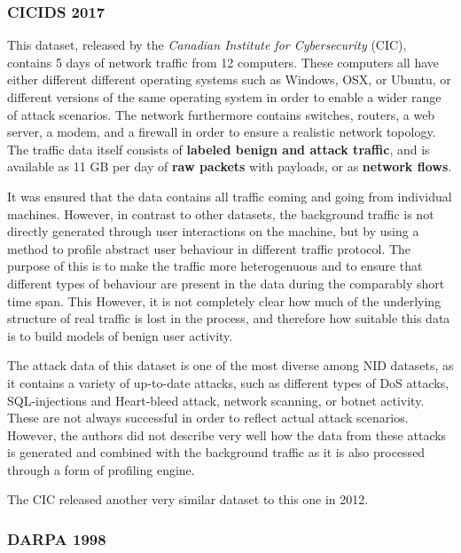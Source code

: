 \documentclass[a4paper,12pt,twoside]{report}
\begin{document}
\subsubsection*{CICIDS 2017 \cite{gharib2016evaluation}\cite{sharafaldin2018towards}}

This dataset, released by the \textit{Canadian Institute for Cybersecurity} (CIC), contains 5 days of network traffic from 12 computers. These computers all have either different different operating systems such as Windows, OSX, or Ubuntu, or different versions of the same operating system in order to enable a wider range of attack scenarios. The network  furthermore contains switches, routers, a web server, a modem, and a firewall in order to ensure a realistic network topology. The traffic data itself consists of \textbf{labeled benign and attack traffic}, and is available as 11 GB per day of \textbf{raw packets} with payloads, or as \textbf{network flows}. 

It was ensured that the data contains all traffic coming and going from individual machines. However, in contrast to other datasets, the background traffic is not directly generated through user interactions on the machine, but by using a method to profile abstract user behaviour in different traffic protocol. The purpose of this is to make the traffic more heterogenuous and to ensure that different types of behaviour are present in the data during the comparably short time span. This  However, it is not completely clear how much of the underlying structure of real traffic is lost in the process, and therefore how suitable this data is to build models of benign user activity.

The attack data of this dataset is one of the most diverse among NID datasets, as it contains a variety of up-to-date attacks, such as different types of DoS attacks, SQL-injections and Heart-bleed attack, network scanning, or botnet activity. These are not always successful in order to reflect actual attack scenarios. However, the authors did not describe very well how the data from these attacks is generated and combined with the background traffic as it is also processed through a form of profiling engine. 

The CIC released another very similar dataset to this one in 2012.

\subsubsection*{DARPA 1998 \cite{lippmann2000evaluating}}
\end{document}
